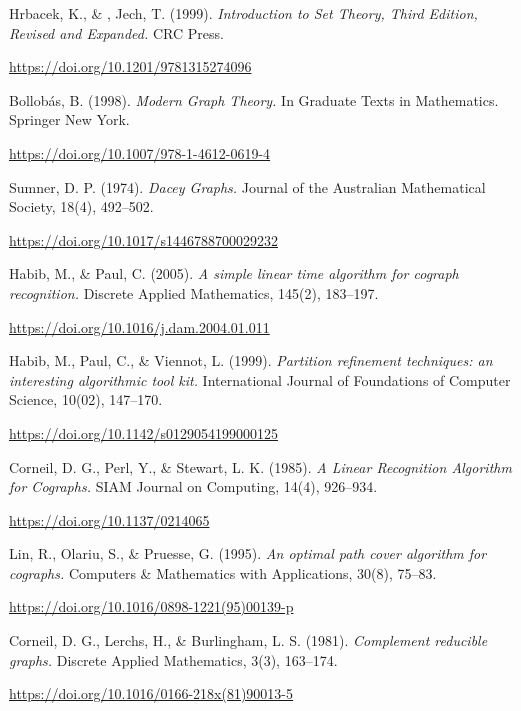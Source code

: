 
\begin{thebibliography}{99}

     Hrbacek, K., \& , Jech, T. (1999).
    \textit{Introduction to Set Theory, Third Edition, Revised and Expanded.} CRC Press.

    \url{https://doi.org/10.1201/9781315274096}

     Bollobás, B. (1998).
    \textit{Modern Graph Theory.}
    In Graduate Texts in Mathematics. Springer New York.

    \url{https://doi.org/10.1007/978-1-4612-0619-4}

     Sumner, D. P. (1974).
    \textit{Dacey Graphs.}
    Journal of the Australian Mathematical Society, 18(4), 492–502.

    \url{https://doi.org/10.1017/s1446788700029232}

     Habib, M., \& Paul, C. (2005).
    \textit{A simple linear time algorithm for cograph recognition.}
    Discrete Applied Mathematics, 145(2), 183–197.

    \url{https://doi.org/10.1016/j.dam.2004.01.011}

     Habib, M., Paul, C., \& Viennot, L. (1999).
    \textit{Partition refinement techniques: an interesting algorithmic tool kit.}
    International Journal of Foundations of Computer Science, 10(02), 147–170.

    \url{https://doi.org/10.1142/s0129054199000125}

     Corneil, D. G., Perl, Y., \& Stewart, L. K. (1985).
    \textit{A Linear Recognition Algorithm for Cographs.}
    SIAM Journal on Computing, 14(4), 926–934.

    \url{https://doi.org/10.1137/0214065}

     Lin, R., Olariu, S., \& Pruesse, G. (1995).
    \textit{An optimal path cover algorithm for cographs.}
    Computers \& Mathematics with Applications, 30(8), 75–83.

    \url{https://doi.org/10.1016/0898-1221(95)00139-p}

     Corneil, D. G., Lerchs, H., \& Burlingham, L. S. (1981).
    \textit{Complement reducible graphs.}
    Discrete Applied Mathematics, 3(3), 163–174.

    \url{https://doi.org/10.1016/0166-218x(81)90013-5}

\end{thebibliography}

